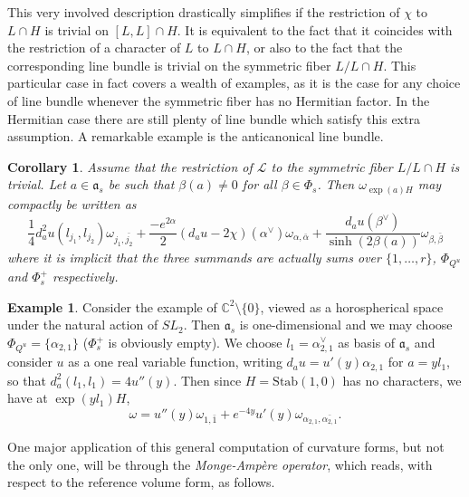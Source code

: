 \documentclass{amsart}
\newtheorem{cor}[thm]{Corollary}
\theoremstyle{definition}
\newtheorem{exa}[thm]{Example}
\begin{document}
This very involved description drastically simplifies if the 
restriction of $\chi$ to $L\cap H$ is trivial on $[L,L]\cap H$.
It is equivalent to the fact that it coincides with the restriction 
of a character of $L$ to $L\cap H$, or also to the fact that the 
corresponding line bundle is trivial on the symmetric 
fiber $L/L\cap H$.
This particular case in fact covers a wealth of examples, as it is the 
case for any choice of line bundle whenever the symmetric fiber has 
no Hermitian factor.
In the Hermitian case there are still plenty of line bundle which 
satisfy this extra assumption. A remarkable example is the 
anticanonical line bundle. 

\begin{cor} 
\label{cor_curv}
Assume that the restriction of $\mathcal{L}$ to the symmetric 
fiber $L/L\cap H$ is trivial.  
Let $a\in \mathfrak{a}_s$ be such that $\beta(a)\neq 0$ for all 
$\beta \in \Phi_s$. Then $\omega_{\exp(a)H}$ may compactly be written 
as 
\[
\frac{1}{4}d^2_au(l_{j_1},l_{j_2})\omega_{j_1,\bar{j_2}}
+  
\frac{-e^{2\alpha}}{2}(d_au-2\chi)(\alpha^{\vee}) \omega_{\alpha,\bar{\alpha}}
+  
\frac{d_au(\beta^{\vee})}{\sinh(2\beta(a))} \omega_{\beta,\bar{\beta}}
\]
where it is implicit that the three summands are actually sums over 
$\{1,\ldots,r\}$, $\Phi_{Q^u}$ and $\Phi_s^+$ respectively.
\end{cor}

\begin{exa}
\label{exa_curv_C2minus0}
Consider the example of $\mathbb{C}^2\setminus\{0\}$, viewed as a 
horospherical space under the natural action of $SL_2$. 
Then $\mathfrak{a}_s$ is one-dimensional and we may choose 
$\Phi_{Q^u}=\{\alpha_{2,1}\}$ ($\Phi_s^+$ is obviously empty).
We choose $l_1=\alpha_{2,1}^{\vee}$ %
as basis of $\mathfrak{a}_s$ and consider $u$ as a one real variable 
function, writing $d_au=u'(y)\alpha_{2,1}$  for $a=yl_1$, so that 
$d^2_a(l_1,l_1)=4u''(y)$. 
Then since $H=\mathrm{Stab}(1,0)$ has no characters, we have 
at $\exp(yl_1)H$,
\[
\omega= u''(y)\omega_{1,\bar{1}} + e^{-4y}u'(y)\omega_{\alpha_{2,1},\bar{\alpha_{2,1}}}. 
\]
\end{exa}

One major application of this general computation of curvature forms, 
but not the only one, will be through the \emph{Monge-Ampère operator}, 
which reads, with respect to the reference volume form, as follows.
\end{document}
